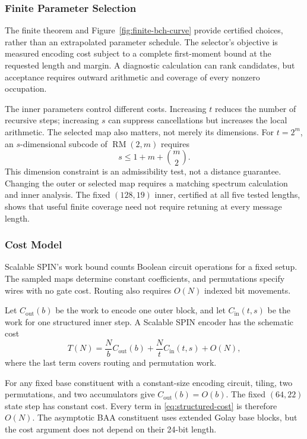 \subsubsection{Finite Parameter Selection}
\label{sec:finite-parameter-extrapolation}

The finite theorem and Figure~\ref{fig:finite-bch-curve} provide certified
choices, rather than an extrapolated parameter schedule.
The selector's objective is measured encoding cost subject to a complete
first-moment bound at the requested length and margin.
A diagnostic calculation can rank candidates, but acceptance requires
outward arithmetic and coverage of every nonzero occupation.

The inner parameters control different costs. Increasing $t$ reduces the
number of recursive steps; increasing $s$ can suppress cancellations but
increases the local arithmetic. The selected map also matters, not merely
its dimensions. For $t=2^m$, an $s$-dimensional subcode of
$\operatorname{RM}(2,m)$ requires
\begin{equation}
  s\le 1+m+\binom m2.
  \label{eq:rm-expansion-capacity}
\end{equation}
This dimension constraint is an admissibility test, not a distance guarantee.
Changing the outer or selected map requires a matching spectrum calculation
and inner analysis. The fixed $(128,19)$ inner, certified at all five
tested lengths, shows that useful finite coverage need not require
retuning at every message length.

\subsubsection{Cost Model}

Scalable SPIN's work bound counts Boolean circuit operations for a fixed setup.
The sampled maps determine constant coefficients, and permutations specify
wires with no gate cost. Routing also requires $O(N)$ indexed bit movements.

Let $C_{\mathrm{out}}(b)$ be the work to encode one outer block, and let
$C_{\mathrm{in}}(t,s)$ be the work for one structured inner step. A
Scalable SPIN encoder has the schematic cost
\begin{equation}
  T(N)
  =
  \frac{N}{b}C_{\mathrm{out}}(b)
  +
  \frac{N}{t}C_{\mathrm{in}}(t,s)
  +O(N),
  \label{eq:structured-cost}
\end{equation}
where the last term covers routing and permutation work.

For any fixed base constituent with a constant-size encoding circuit, tiling,
two permutations, and two accumulators give
$C_{\mathrm{out}}(b)=O(b)$. The fixed $(64,22)$ state step has constant cost.
Every term in \eqref{eq:structured-cost} is therefore $O(N)$. The asymptotic
BAA constituent uses extended Golay base blocks, but the cost argument
does not depend on their 24-bit length.
